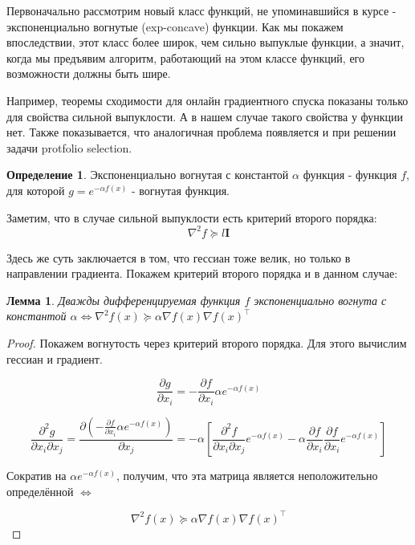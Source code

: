 \documentclass[12pt]{article}
\newtheorem*{lemma}{Лемма}
\theoremstyle{definition}
\newtheorem*{definition}{Определение}
\begin{document}
\bigskip
Первоначально рассмотрим новый класс функций, не упоминавшийся в курсе - экспоненциально вогнутые (exp-concave) функции. Как мы покажем впоследствии, этот класс более широк, чем сильно выпуклые функции, а значит, когда мы предъявим алгоритм, работающий на этом классе функций, его возможности должны быть шире.

\bigskip
Например, теоремы сходимости для онлайн градиентного спуска показаны только для свойства сильной выпуклости. А в нашем случае такого свойства у функции нет. Также показывается, что аналогичная проблема появляется и при решении задачи protfolio selection.

\bigskip
 
\theoremstyle{definition}
\begin{definition}{Экспоненциально вогнутая с константой $\alpha$ функция}
 - функция $f$, для которой $g = e^{-\alpha f(x)}$ - вогнутая функция.
\end{definition}

Заметим, что в случае сильной выпуклости есть критерий второго порядка: $$\nabla^2 f \succcurlyeq l\mathbf{I}$$

Здесь же суть заключается в том, что гессиан тоже велик, но только в направлении градиента. Покажем критерий второго порядка и в данном случае:

\begin{lemma}
Дважды дифференцируемая функция $f$ экспоненциально вогнута с константой $\alpha \iff \nabla^2 f(x) \succcurlyeq \alpha \nabla f(x) \nabla f(x)^\top$
\end{lemma}

\begin{proof}
Покажем вогнутость через критерий второго порядка. Для этого вычислим гессиан и градиент.

$$ \frac{\partial g}{\partial x_i} = -\frac{\partial f}{\partial x_i} \alpha e^{-\alpha f(x)} $$

$$ \frac{\partial^2 g}{\partial x_i \partial x_j} = \frac{\partial \left(-\frac{\partial f}{\partial x_i} \alpha e^{-\alpha f(x)}\right)}{\partial x_j} = -\alpha \left[ \frac{\partial^2 f}{\partial x_i \partial x_j} e^{-\alpha f(x)} - \alpha \frac{\partial f}{\partial x_i} \frac{\partial f}{\partial x_i} e^{-\alpha f(x)} \right] $$

Сократив на $\alpha e^{-\alpha f(x)}$, получим, что эта матрица является неположительно определённой $\Leftrightarrow$

$$ \nabla^2 f(x) \succcurlyeq \alpha \nabla f(x) \nabla f(x)^\top $$
\end{proof}
\end{document}
